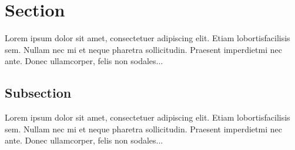\documentclass{article}
\begin{document}
\tableofcontents
\section{Section}
Lorem  ipsum  dolor  sit  amet,  consectetuer  adipiscing  elit. Etiam  lobortisfacilisis sem. Nullam nec mi et neque pharetra sollicitudin. Praesent imperdietmi nec ante. Donec ullamcorper, felis non sodales...
\subsection{Subsection}
Lorem  ipsum  dolor  sit  amet,  consectetuer  adipiscing  elit. Etiam  lobortisfacilisis sem. Nullam nec mi et neque pharetra sollicitudin. Praesent imperdietmi nec ante. Donec ullamcorper, felis non sodales...
\end{document}
